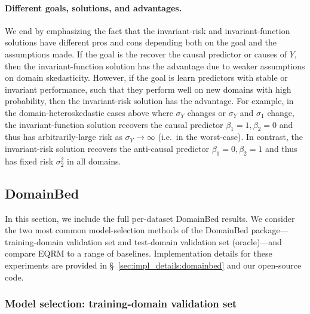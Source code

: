 \documentclass{article}
\begin{document}
\paragraph{Different goals, solutions, and advantages.} We end by emphasizing the fact that 
%
the invariant-risk and invariant-function solutions have different pros and cons depending both on the goal and the assumptions made. If the goal is the recover the causal predictor or causes of $Y$, then the invariant-function solution has the advantage due to weaker assumptions on domain skedasticity. However, if the goal is learn predictors with stable or invariant performance, such that they perform well on new domains with high probability, then the invariant-risk solution has the advantage. For example, in the domain-heteroskedastic cases above where $\sigma_Y$ changes or $\sigma_Y$ and $\sigma_1$ change, the invariant-function solution recovers the causal predictor $\beta_1=1, \beta_2=0$ and thus has arbitrarily-large risk as $\sigma_Y \to \infty$ (i.e.\ in the worst-case). In contrast, the invariant-risk solution recovers the anti-causal predictor $\beta_1=0, \beta_2=1$ and thus has fixed risk $\sigma^2_2$ in all domains.

%
%
%


%

\subsection{DomainBed}%
\label{sec:additional_exps:domainbed}%

In this section, we include the full per-dataset DomainBed results. We consider the two most common model-selection methods of the DomainBed package---training-domain validation set and test-domain validation set (oracle)---and compare EQRM to a range of baselines. Implementation details for these experiments are provided in \S~\ref{sec:impl_details:domainbed} and our open-source code.


\subsubsection{Model selection: training-domain validation set} \label{sec:additional_exps:domainbed:train-dom}
\end{document}
